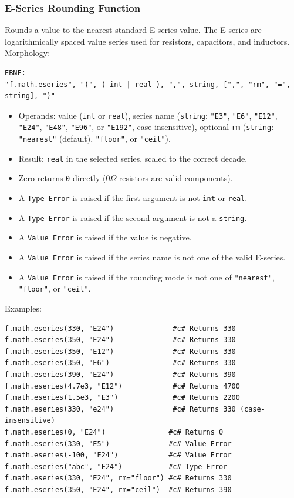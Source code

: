 \subsubsection{E-Series Rounding Function}
Rounds a value to the nearest standard E-series value. The E-series are logarithmically spaced value series used for resistors, capacitors, and inductors. \\
Morphology:
\begin{verbatim}
EBNF:
"f.math.eseries", "(", ( int | real ), ",", string, [",", "rm", "=", string], ")"
\end{verbatim}
\begin{itemize}
\item Operands: value (\texttt{int} or \texttt{real}), series name (\texttt{string}: \texttt{"E3"}, \texttt{"E6"}, \texttt{"E12"}, \texttt{"E24"}, \texttt{"E48"}, \texttt{"E96"}, or \texttt{"E192"}, case-insensitive), optional \texttt{rm} (\texttt{string}: \texttt{"nearest"} (default), \texttt{"floor"}, or \texttt{"ceil"}).
\item Result: \texttt{real} in the selected series, scaled to the correct decade.
\item Zero returns \texttt{0} directly ($0\Omega$ resistors are valid components).
\item A \texttt{Type Error} is raised if the first argument is not \texttt{int} or \texttt{real}.
\item A \texttt{Type Error} is raised if the second argument is not a \texttt{string}.
\item A \texttt{Value Error} is raised if the value is negative.
\item A \texttt{Value Error} is raised if the series name is not one of the valid E-series.
\item A \texttt{Value Error} is raised if the rounding mode is not one of \texttt{"nearest"}, \texttt{"floor"}, or \texttt{"ceil"}.
\end{itemize}
Examples:
\begin{verbatim}
f.math.eseries(330, "E24")              #c# Returns 330
f.math.eseries(350, "E24")              #c# Returns 330
f.math.eseries(350, "E12")              #c# Returns 330
f.math.eseries(350, "E6")               #c# Returns 330
f.math.eseries(390, "E24")              #c# Returns 390
f.math.eseries(4.7e3, "E12")            #c# Returns 4700
f.math.eseries(1.5e3, "E3")             #c# Returns 2200
f.math.eseries(330, "e24")              #c# Returns 330 (case-insensitive)
f.math.eseries(0, "E24")               #c# Returns 0
f.math.eseries(330, "E5")              #c# Value Error
f.math.eseries(-100, "E24")            #c# Value Error
f.math.eseries("abc", "E24")           #c# Type Error
f.math.eseries(330, "E24", rm="floor") #c# Returns 330
f.math.eseries(350, "E24", rm="ceil")  #c# Returns 390
\end{verbatim}

